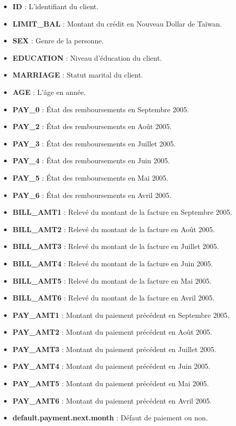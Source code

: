 \documentclass[10pt, french, a4paper]{report}
\begin{document}
\begin{itemize}
  \item \textbf{ID} : L'identifiant du client. 
  \item \textbf{LIMIT\_BAL} : Montant du crédit en Nouveau Dollar de Taïwan.
  \item \textbf{SEX} : Genre de la personne.
  \item \textbf{EDUCATION} : Niveau d'éducation du client.
  \item \textbf{MARRIAGE} : Statut marital du client.
  \item \textbf{AGE} : L'âge en année.
  \item \textbf{PAY\_0} : État des remboursements en Septembre 2005.
  \item \textbf{PAY\_2} : État des remboursements en Août 2005.
  \item \textbf{PAY\_3} : État des remboursements en Juillet 2005.
  \item \textbf{PAY\_4} : État des remboursements en Juin 2005.
  \item \textbf{PAY\_5} : État des remboursements en Mai 2005.
  \item \textbf{PAY\_6} : État des remboursements en Avril 2005.
  \item \textbf{BILL\_AMT1} : Relevé du montant de la facture en Septembre 2005.
  \item \textbf{BILL\_AMT2} : Relevé du montant de la facture en Août 2005.
  \item \textbf{BILL\_AMT3} : Relevé du montant de la facture en Juillet 2005.
  \item \textbf{BILL\_AMT4} : Relevé du montant de la facture en Juin 2005.
  \item \textbf{BILL\_AMT5} : Relevé du montant de la facture en Mai 2005.
  \item \textbf{BILL\_AMT6} : Relevé du montant de la facture en Avril 2005.
  \item \textbf{PAY\_AMT1} : Montant du paiement précédent en Septembre 2005.
  \item \textbf{PAY\_AMT2} : Montant du paiement précédent en Août 2005.
  \item \textbf{PAY\_AMT3} : Montant du paiement précédent en Juillet 2005.
  \item \textbf{PAY\_AMT4} : Montant du paiement précédent en Juin 2005.
  \item \textbf{PAY\_AMT5} : Montant du paiement précédent en Mai 2005.
  \item \textbf{PAY\_AMT6} : Montant du paiement précédent en Avril 2005.
  \item \textbf{default.payment.next.month} : Défaut de paiement ou non.

\end{itemize}
\end{document}
